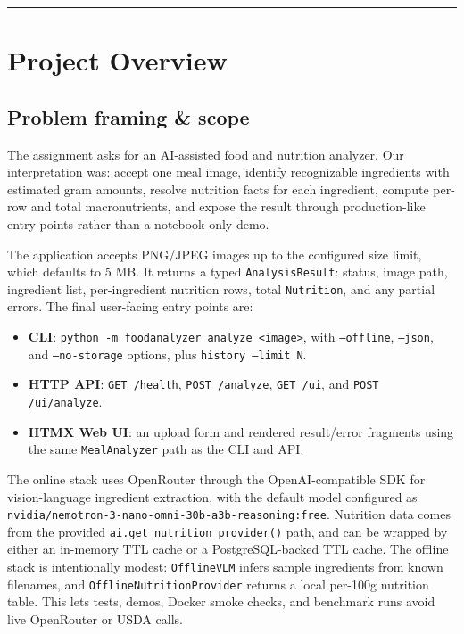\documentclass[11pt,a4paper]{article}
\begin{document}
\tableofcontents
\vspace{0.6em}\hrule\vspace{0.4em}

\newpage
\section{Project Overview}

\subsection{Problem framing \& scope}
The assignment asks for an AI-assisted food and nutrition analyzer. Our interpretation was: accept one meal image, identify recognizable ingredients with estimated gram amounts, resolve nutrition facts for each ingredient, compute per-row and total macronutrients, and expose the result through production-like entry points rather than a notebook-only demo.

The application accepts PNG/JPEG images up to the configured size limit, which defaults to 5 MB. It returns a typed \texttt{AnalysisResult}: status, image path, ingredient list, per-ingredient nutrition rows, total \texttt{Nutrition}, and any partial errors. The final user-facing entry points are:
\begin{itemize}[itemsep=2pt]
  \item \textbf{CLI}: \texttt{python -m foodanalyzer analyze <image>}, with \texttt{--offline}, \texttt{--json}, and \texttt{--no-storage} options, plus \texttt{history --limit N}.
  \item \textbf{HTTP API}: \texttt{GET /health}, \texttt{POST /analyze}, \texttt{GET /ui}, and \texttt{POST /ui/analyze}.
  \item \textbf{HTMX Web UI}: an upload form and rendered result/error fragments using the same \texttt{MealAnalyzer} path as the CLI and API.
\end{itemize}

The online stack uses OpenRouter through the OpenAI-compatible SDK for vision-language ingredient extraction, with the default model configured as \texttt{nvidia/nemotron-3-nano-omni-30b-a3b-reasoning:free}. Nutrition data comes from the provided \texttt{ai.get\_nutrition\_provider()} path, and can be wrapped by either an in-memory TTL cache or a PostgreSQL-backed TTL cache. The offline stack is intentionally modest: \texttt{OfflineVLM} infers sample ingredients from known filenames, and \texttt{OfflineNutritionProvider} returns a local per-100g nutrition table. This lets tests, demos, Docker smoke checks, and benchmark runs avoid live OpenRouter or USDA calls.
\end{document}
